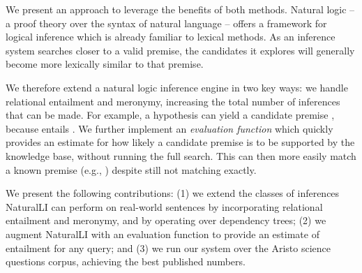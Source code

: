 We present an approach to leverage the benefits of both methods.
Natural logic -- a proof theory over the syntax of natural language --
  offers a framework for logical inference which is already
  familiar to lexical methods.
As an inference system searches closer to a valid premise,
  the candidates it explores will generally become more lexically similar
  to that premise.

We therefore extend a natural logic inference engine in two key ways:
  we handle relational entailment 
  and meronymy, increasing the total number of inferences that can be made.
  For example, a hypothesis  can yield
  a candidate premise , because 
  entails .
We further implement an \textit{evaluation function} which quickly
  provides an estimate for how likely a candidate premise is to be supported
  by the knowledge base, without running the full search.
This can then more easily match a known premise 
  (e.g., ) 
  despite still not matching exactly.

We present the following contributions:
(1) we extend the classes of inferences NaturalLI can perform on real-world 
    sentences by
    incorporating relational entailment and meronymy, and by operating over 
    dependency trees;
(2) we augment NaturalLI with an evaluation function to provide an estimate of entailment
    for any query; and 
(3) we run our system over the Aristo science questions corpus,
    achieving the best published numbers.


